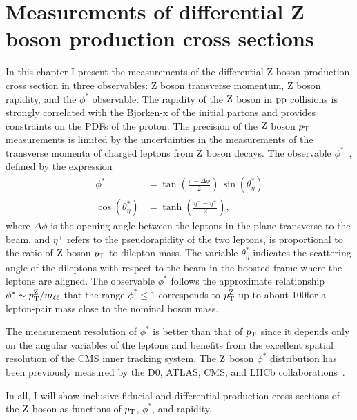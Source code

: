 \chapter{Measurements of differential Z boson production cross sections}
In this chapter I present the measurements of the differential Z boson production cross section
in three observables: Z boson transverse momentum, Z boson rapidity, and the $\phi^*$ observable.
The rapidity of the $\mathrm{Z}$ boson in $\mathrm{p}\mathrm{p}$ collisions is strongly correlated 
with the Bjorken-x of the initial partons and provides constraints on the PDFs 
of the proton.
The precision of the $\mathrm{Z}$ boson $p_{\mathrm{T}}$ measurements is limited by the uncertainties in the measurements of the transverse momenta of charged leptons from $\mathrm{Z}$ boson decays.
The observable $\phi^*$~\cite{Banfi:2010cf,Banfi:2012du,Marzani:2013nza}, defined by the expression
\begin{align}
\label{eq0}
\phi^*  &= \tan \left( \frac{\pi -\Delta\phi}{2} \right) \, \sin(\theta^*_\eta) \\
\nonumber
\cos(\theta^*_\eta)&=\tanh(\frac{\eta^- - \eta^+}{2}),
\end{align}
where $\Delta\phi$ is the opening angle between the leptons in the plane 
transverse to the beam, and $\eta^\pm$ refers to the pseudorapidity of the 
two leptons, is proportional to the ratio of $\mathrm{Z}$ boson $p_{\mathrm{T}}$ to dilepton mass. 
The variable $\theta^*_\eta$ indicates the scattering angle of the dileptons 
with respect to the beam in the boosted frame where the leptons are aligned. 
The observable $\phi^*$ follows the approximate relationship 
$\phi^* \sim p_{\mathrm{T}}^{\mathrm{Z}} / m_{\ell\ell}$ that the range $\phi^* \le 1$ 
corresponds to $p_{\mathrm{T}}^{\mathrm{Z}}$ up to about 100\GeV for a lepton-pair mass close 
to the nominal \cPZ{} boson mass.

The measurement resolution of $\phi^*$ is better than that of $p_{\mathrm{T}}$ since it depends only on the angular variables of 
the leptons and benefits from the  excellent spatial resolution of the CMS 
inner tracking system. The $\mathrm{Z}$ boson $\phi^*$ distribution has been 
previously measured by the D0, ATLAS, CMS, and LHCb 
collaborations~\cite{TevatronWZ:D0PhysRevLett2011_106,Aad:2015auj,Sirunyan:2017igm,Aaij:2016mgv}.     

In all, I will show inclusive fiducial and differential production cross sections of 
the $\mathrm{Z}$ boson as functions of $p_{\mathrm{T}}$, $\phi^*$, and rapidity. 

